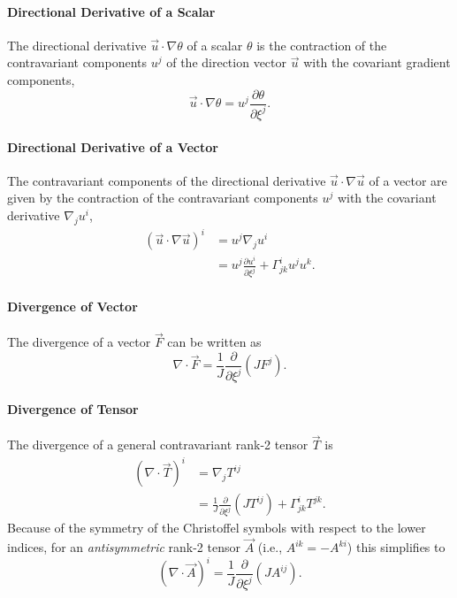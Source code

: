 \documentclass{report}
\begin{document}
\paragraph{Directional Derivative of a Scalar} The  directional derivative $\vec{u} \cdot \nabla \theta$ of a scalar $\theta$ is the contraction of the contravariant components $u^j$ of the direction vector $\vec{u}$ with the covariant gradient components,
\begin{equation}
\vec{u} \cdot \nabla \theta = u^j \frac{\partial\theta}{\partial \xi^j}.
\end{equation}

\paragraph{Directional Derivative of a Vector} The contravariant components of the directional derivative $\vec{u} \cdot \nabla \vec{u}$ of a vector are given by the contraction of the contravariant components $u^j$ with the covariant derivative $\nabla_j u^i$,
\begin{equation}
\begin{split}
(\vec{u} \cdot \nabla \vec{u})^i & = u^j \nabla_j u^i \\
& = u^j \frac{\partial u^i}{\partial \xi^j} + \Gamma^i_{jk} u^j u^k.
\end{split}
\end{equation}

\paragraph{Divergence of Vector} The divergence of a vector $\vec{F}$ can be written as 
\begin{equation}\label{e:div-of-vec}
    \nabla \cdot \vec{F} = \frac{1}{J} \frac{\partial}{\partial \xi^j} \left(J {F}^j \right).
\end{equation}

\paragraph{Divergence of Tensor} The divergence of a general contravariant rank-2 tensor $\vec{T}$ is  
\begin{equation}\label{e:tensor_div}
\begin{split}
(\nabla \cdot \vec{T})^i & = \nabla_j T^{ij} \\ 
&= \frac{1}{J} \frac{\partial}{\partial \xi^j} \left(J {T}^{ij} \right) + \Gamma^i_{jk} T^{jk}.
\end{split}
\end{equation}
Because of the symmetry of the Christoffel symbols with respect to the lower indices, for an \emph{antisymmetric} rank-2 tensor $\vec{A}$ (i.e., $A^{ik} = - A^{ki}$) this simplifies to
\[
(\nabla \cdot \vec{A})^i = \frac{1}{J} \frac{\partial}{\partial \xi^j} \left(J {A}^{ij} \right).
\]
\end{document}
